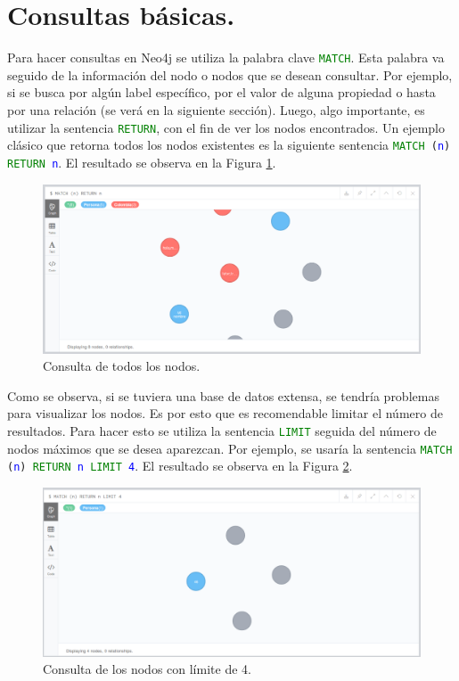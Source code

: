\documentclass[conference]{IEEEtran}
\begin{document}
\section{Consultas básicas.}

Para hacer consultas en Neo4j se utiliza la palabra clave \texttt{\textcolor{green}{MATCH}}. Esta palabra va seguido de la información del nodo o nodos que se desean consultar. Por ejemplo, si se busca por algún label específico, por el valor de alguna propiedad o hasta por una relación (se verá en la siguiente sección). Luego, algo importante, es utilizar la sentencia \texttt{\textcolor{green}{RETURN}}, con el fin de ver los nodos encontrados. Un ejemplo clásico que retorna todos los nodos existentes es la siguiente sentencia \texttt{\textcolor{green}{MATCH} (\textcolor{blue}{n}) \textcolor{green}{RETURN} \textcolor{blue}{n}}. El resultado se observa en la Figura \ref{fig20}.


\begin{figure}[H]
\begin{center}
\includegraphics[width= 0.45 \textwidth]{consulta_todo1.png}
\end{center}
\caption{Consulta de todos los nodos.}
\label{fig20}
\end{figure}

Como se observa, si se tuviera una base de datos extensa, se tendría problemas para visualizar los nodos. Es por esto que es recomendable limitar el número de resultados. Para hacer esto se utiliza la sentencia \texttt{\textcolor{green}{LIMIT}} seguida del número de nodos máximos que se desea aparezcan. Por ejemplo, se usaría la sentencia \texttt{\textcolor{green}{MATCH} (\textcolor{blue}{n}) \textcolor{green}{RETURN} \textcolor{blue}{n} \textcolor{green}{LIMIT} \textcolor{blue}{4}}. El resultado se observa en la Figura \ref{fig21}.

\begin{figure}[H]
\begin{center}
\includegraphics[width= 0.45 \textwidth]{consulta_limite1.png}
\end{center}
\caption{Consulta de los nodos con límite de 4.}
\label{fig21}
\end{figure}
\end{document}
